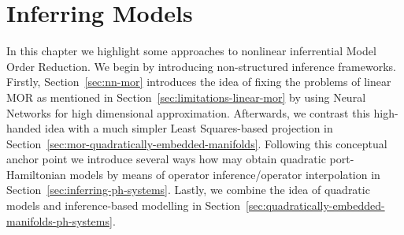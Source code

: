 \chapter{Inferring Models}\label{chap:inferring-models}

In this chapter we highlight some approaches to nonlinear inferrential Model Order Reduction.
We begin by introducing non-structured inference frameworks.
Firstly, Section~\ref{sec:nn-mor} introduces the idea of fixing the problems of linear MOR as mentioned in Section~\ref{sec:limitations-linear-mor} by using Neural Networks for high dimensional approximation.
Afterwards, we contrast this high-handed idea with a much simpler Least Squares-based projection in Section~\ref{sec:mor-quadratically-embedded-manifolds}.
Following this conceptual anchor point we introduce several ways how may obtain quadratic port-Hamiltonian models by means of operator inference/operator interpolation in Section~\ref{sec:inferring-ph-systems}.
Lastly, we combine the idea of quadratic models and inference-based modelling in Section~\ref{sec:quadratically-embedded-manifolds-ph-systems}.





